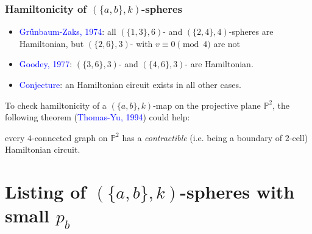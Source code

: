 \documentclass{beamer}
\begin{document}
\begin{frame}\frametitle{Hamiltonicity of $(\{a,b\},k)$-spheres}
\begin{itemize}
\item \textcolor{blue}{Gr\H{u}nbaum-Zaks, 1974}:
all $(\{1,3\},6)$-
and $(\{2,4\},4)$-spheres are Hamiltonian, but $(\{2,6\},3)$-
with $v \equiv 0 \pmod 4$ are not
\item \textcolor{blue}{Goodey, 1977}:
 $(\{3,6\},3)$-
and $(\{4,6\},3)$- are Hamiltonian.
\item \textcolor{blue}{Conjecture}: an Hamiltonian circuit exists in
all other cases.
\end{itemize}
To check hamiltonicity of  a $(\{a,b\},k)$-map on the 
projective plane $\mathbb{P}^2$, the 
following theorem
(\textcolor{blue}{Thomas-Yu, 1994}) could help: 

every $4$-connected graph 
on $\mathbb{P}^2$ 
has
a {\em contractible} (i.e. being a boundary of $2$-cell) Hamiltonian circuit.


\end{frame}
\section[]{Listing of $(\{a,b\},k)$-spheres with small $p_b$}

\end{document}
